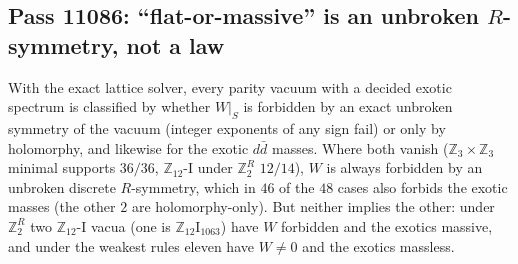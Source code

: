 \subsection{Pass 11086: ``flat-or-massive'' is an unbroken $R$-symmetry, not a law}

With the exact lattice solver, every parity vacuum with a decided exotic spectrum is classified by whether $W|_S$ is
forbidden by an exact unbroken symmetry of the vacuum (integer exponents of any sign fail) or only by holomorphy, and
likewise for the exotic $d\bar d$ masses.  Where both vanish ($\mathbb{Z}_3\times\mathbb{Z}_3$ minimal supports $36/36$,
$\mathbb{Z}_{12}$-I under $\mathbb{Z}_2^R$ $12/14$), $W$ is always forbidden by an unbroken discrete $R$-symmetry, which in
$46$ of the $48$ cases also forbids the exotic masses (the other $2$ are holomorphy-only). But neither implies the other:
under $\mathbb{Z}_2^R$ two $\mathbb{Z}_{12}$-I vacua (one is $\mathbb{Z}_{12}$I$_{1063}$) have $W$ forbidden and the exotics
massive, and under the weakest rules eleven have $W\neq0$ and the exotics massless.
